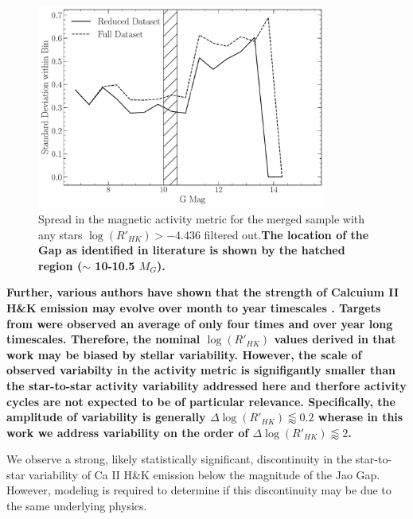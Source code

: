\begin{figure}
  \centering
  \includegraphics[width=0.85\textwidth]{figures/jaoMagActivity/ReducedDeviation.pdf}
  \caption{Spread in the magnetic activity metric for the merged sample with
  any stars $\log(R'_{HK}) > -4.436$ filtered out.\textbf{The location of the Gap
  as identified in literature is shown by the hatched region ($\sim$ 10-10.5 $M_{G}$).}}
  \label{fig:reduced}
\end{figure}

\textbf{Further, various authors have shown that the strength of Calcuium II
H\&K emission may evolve over month to year timescales
\citep[e.g.][]{Rauscher2006, Perdelwitz2021, Cretignier2024}. Targets from
\citet{Boudreaux2022} were observed an average of only four times and over year
long timescales. Therefore, the nominal $\log(R'_{HK})$ values derived in that
work may be biased by stellar variability. However, the scale of observed
variabilty in the activity metric is signifigantly smaller than the
star-to-star activity variability addressed here and therfore activity cycles
are not expected to be of particular relevance. Specifically, the amplitude of
variability is generally $\Delta \log(R'_{HK}) \lessapprox 0.2$ wherase in this
work we address variability on the order of $\Delta \log(R'_{HK}) \lessapprox 2$.}

We observe a strong, likely statistically significant, discontinuity in the
star-to-star variability of Ca II H\&K emission below the magnitude
of the Jao Gap. However, modeling is required to determine if this discontinuity
may be due to the same underlying physics.

